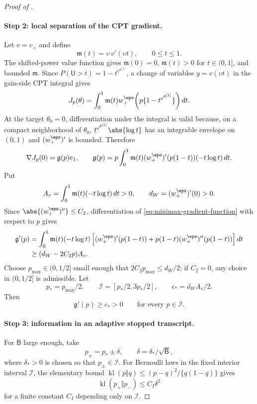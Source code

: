 \begin{proof}[Proof of ]
\paragraph{Step 2: local separation of the CPT gradient.}
Let $v=v_+$ and define
\[
 \mathfrak m(t)=\upsilon\,v'(\upsilon t),\qquad 0\le t\le1.
\]
The shifted-power value function gives $\mathfrak m(0)=0$, $\mathfrak m(t)>0$ for $t\in(0,1]$, and bounded $\mathfrak m$.  Since
$P(\mathsf U>t)=1-t^{e^{\theta^{[1]}}}$, a change of variables $y=v(\upsilon t)$ in the gain-side CPT integral gives
\begin{equation}\label{eq:minimax-cpt-submodel}
 J_p(\theta)
 =\int_0^1 \mathfrak m(t)
 w_+^\eps\!\left(p\{1-t^{e^{\theta^{[1]}}}\}\right)dt.
\end{equation}
At the target $\theta_0=0$, differentiation under the integral is valid because, on a compact neighborhood of $\theta_0$,
$t^{e^{\theta^{[1]}}}\abs{\log t}$ has an integrable envelope on $(0,1)$ and $(w_+^\eps)'$ is bounded.  Therefore
\begin{equation}\label{eq:minimax-gradient-function}
 \nabla J_p(0)=\mathfrak g(p)e_1,
 \qquad
 \mathfrak g(p)
 =p\int_0^1\mathfrak m(t)(w_+^\eps)'(p(1-t))(-t\log t)\,dt.
\end{equation}
Put
\[
 A_v=\int_0^1\mathfrak m(t)(-t\log t)\,dt>0,
 \qquad
 d_W=(w_+^\eps)'(0)>0.
\]
Since $\abs{(w_+^\eps)''}\le C_2$, differentiation of \eqref{eq:minimax-gradient-function} with respect to $p$ gives
\begin{align*}
 \mathfrak g'(p)
 &=\int_0^1\mathfrak m(t)(-t\log t)
 \left[(w_+^\eps)'(p(1-t))+p(1-t)(w_+^\eps)''(p(1-t))\right]dt\\
 &\ge (d_W-2C_2p)A_v.
\end{align*}
Choose $p_{\max}\in(0,1/2]$ small enough that $2C_2p_{\max}\le d_W/2$; if $C_2=0$, any choice in $(0,1/2]$ is admissible.  Let
\[
 p_*=p_{\max}/2,
 \qquad
 \mathcal I=[p_*/2,3p_*/2],
 \qquad
 c_*=d_WA_v/2.
\]
Then
\begin{equation}\label{eq:minimax-gradient-separation}
 \mathfrak g'(p)\ge c_*>0
 \qquad\text{for every }p\in\mathcal I.
\end{equation}

\paragraph{Step 3: information in an adaptive stopped transcript.}
For $\mathsf B$ large enough, take
\[
 p_\pm=p_*\pm\delta,
 \qquad
 \delta=\delta_*/\sqrt{\mathsf B},
\]
where $\delta_*>0$ is chosen so that $p_\pm\in\mathcal I$.  For Bernoulli laws in the fixed interior interval $\mathcal I$, the elementary bound
$\operatorname{kl}(p\Vert q)\le (p-q)^2/\{q(1-q)\}$ gives
\begin{equation}\label{eq:bernoulli-kl-bound}
 \operatorname{kl}(p_+\Vert p_-)
 \le C_I\delta^2
\end{equation}
for a finite constant $C_I$ depending only on $\mathcal I$.


\end{proof}

